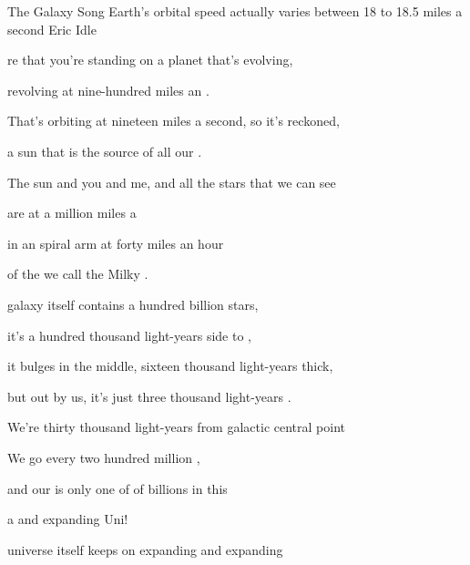 \begin{SBSong}{The Galaxy Song}
  {Earth's orbital speed actually varies between 18 to 18.5 miles a second}
  {Eric Idle}
  \begin{SBVerse}
     re that you're standing on a planet that's evolving,

    revolving at nine-hundred miles an .

    That's orbiting at nineteen miles a second, so it's reckoned, 

    a sun that is the source of all our . 

    The sun and you and me, and all the stars that we can see 

    are  at a million miles a 

    in an  spiral arm at forty  miles an hour 

    of the  we call the Milky .
  \end{SBVerse}
  \begin{SBVerse}
     galaxy itself contains a hundred billion stars, 
    
    it's a hundred thousand light-years side to , 
    
    it bulges in the middle, sixteen thousand light-years thick, 
    
    but out by us, it's just three thousand light-years . 
    
    We're thirty thousand light-years from galactic central point
 
    We go  every two hundred million , 
    
    and our  is only one of  of billions in this 
    
    a and expanding Uni!
  \end{SBVerse}
  \CBPageBrk
  \begin{SBVerse}
     universe itself keeps on expanding and expanding 
    

\end{SBVerse}
\end{SBSong}
